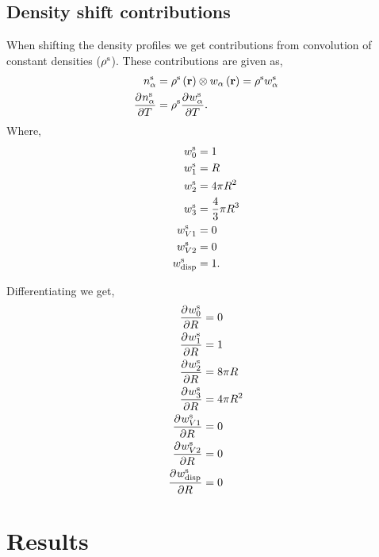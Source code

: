 \documentclass[12pt, letterpaper]{article}
\newcommand*{\pd}[3][]{\frac{\partial^{#1}#2}{\partial{#3}^{#1}}}%
\newcommand*{\lb}{\ensuremath{\left(}}
\newcommand*{\rb}{\ensuremath{\right)}}
\begin{document}
\subsection{Density shift contributions}

When shifting the density profiles we get contributions from convolution of constant densities ($\rho^{\rm{s}}$). These contributions are given as,
\begin{align}
  \label{eq:n_alpha_diff_steady}
  n_\alpha^{\rm{s}} &= \rho^{\rm{s}} \lb \mathbf{r} \rb \otimes w_\alpha \lb \mathbf{r}\rb = \rho^{\rm{s}} w_\alpha^{\rm{s}} \\
  \pd{n_\alpha^{\rm{s}}}{T} &= \rho^{\rm{s}} \pd{w_\alpha^{\rm{s}}}{T}.
\end{align}
Where,
\begin{align}
  \label{eq:weight_functions_steady}
  w_0^{\rm{s}} &= 1  \\
  w_1^{\rm{s}} &= R  \\
  w_2^{\rm{s}} &= 4 \pi R^2  \\
  w_3^{\rm{s}} &= \frac{4}{3} \pi R^3  \\
  w_{V1}^{\rm{s}} &= 0  \\
  w_{V2}^{\rm{s}} &= 0  \\
  w_{\rm{disp}}^{\rm{s}} &= 1.
\end{align}

Differentiating we get,
\begin{align}
  \label{eq:weight_functions_steady_diff}
  \pd{w_0^{\rm{s}}}{R} &= 0  \\
  \pd{w_1^{\rm{s}}}{R} &= 1  \\
  \pd{w_2^{\rm{s}}}{R} &= 8 \pi R  \\
  \pd{w_3^{\rm{s}}}{R} &= 4 \pi R^2  \\
  \pd{w_{V1}^{\rm{s}}}{R} &= 0  \\
  \pd{w_{V2}^{\rm{s}}}{R} &= 0  \\
  \pd{w_{\rm{disp}}^{\rm{s}}}{R} &= 0
\end{align}

\section{Results}



\clearpage


\end{document}
